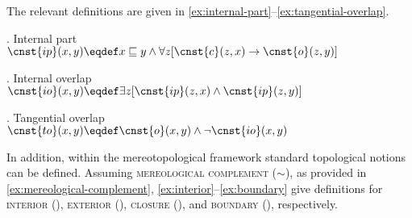 \begin{figure}[h!]
\begin{floatrow}
\captionsetup{margin=.05\linewidth}
        {}
         {}
        {}
\end{floatrow}
\end{figure}

The relevant definitions are given in \ref{ex:internal-part}--\ref{ex:tangential-overlap}.

\ex. Internal part \citep[p. 55; adapted]{casati_varzi1999parts}\label{ex:internal-part}\\
$\cnst{ip}(x,y) \eqdef x \sqsubseteq y \wedge \forall z[\cnst{c}(z,x) \rightarrow \cnst{o}(z,y)]$

\ex. Internal overlap \citep[p. 55; adapted]{casati_varzi1999parts}\label{ex:internal-overlap}\\
$\cnst{io}(x,y) \eqdef \exists z[\cnst{ip}(z,x) \wedge \cnst{ip}(z,y)]$

\ex. Tangential overlap \citep[p. 55; adapted]{casati_varzi1999parts}\label{ex:tangential-overlap}\\
$\cnst{to}(x,y) \eqdef \cnst{o}(x,y) \wedge \neg \cnst{io}(x,y)$

In addition, within the mereotopological framework standard topological notions can be defined. Assuming \textsc{mereological complement} (${\sim}$), as provided in \ref{ex:mereological-complement}, \ref{ex:interior}--\ref{ex:boundary} give definitions for \textsc{interior} (), \textsc{exterior} (), \textsc{closure} (), and \textsc{boundary} (), respectively.   

